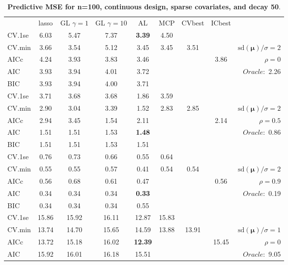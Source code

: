 \clearpage
\begin{table}\vspace{-.5cm}
\caption[l]{ { \bf Predictive MSE for n=100, continuous design, 
sparse covariates, and  decay  50}.}
\vspace{-.5cm}
\footnotesize{}
\begin{center}
\begin{tabular}{l*{7}{c}|r}
 & lasso & GL $\gamma=1$ & GL $\gamma=10$ & AL & MCP  & CVbest & ICbest  \\
\cline{1-9}
CV.1se & 6.03 & 5.47 & 7.37 & {\bf 3.39} & 4.50 & & & \\
CV.min & 3.66 & 3.54 & 5.12 & 3.45 & 3.45 & 3.51 & & $\mathrm{sd}(\mathbf{\mu})/\sigma=2$ \\
AICc & 4.24 & 3.93 & 3.83 & 3.46 & & & 3.86 &  $\rho=0$ \\
AIC & 3.93 & 3.94 & 4.01 & 3.72 & & & &  \multirow{2}{*}{$Oracle: $ 2.26} \\
BIC & 3.93 & 3.94 & 4.00 & 3.71 & & & &  \\
 \hline 
CV.1se & 3.71 & 3.68 & 3.68 & 1.86 & 3.59 & & & \\
CV.min & 2.90 & 3.04 & 3.39 & 1.52 & 2.83 & 2.85 & & $\mathrm{sd}(\mathbf{\mu})/\sigma=2$ \\
AICc & 2.94 & 3.45 & 1.54 & 2.11 & & & 2.14 &  $\rho=0.5$ \\
AIC & 1.51 & 1.51 & 1.53 & {\bf 1.48} & & & &  \multirow{2}{*}{$Oracle: $ 0.86} \\
BIC & 1.51 & 1.51 & 1.53 & 1.51 & & & &  \\
 \hline 
CV.1se & 0.76 & 0.73 & 0.66 & 0.55 & 0.64 & & & \\
CV.min & 0.55 & 0.55 & 0.57 & 0.41 & 0.54 & 0.54 & & $\mathrm{sd}(\mathbf{\mu})/\sigma=2$ \\
AICc & 0.56 & 0.68 & 0.61 & 0.47 & & & 0.56 &  $\rho=0.9$ \\
AIC & 0.34 & 0.34 & 0.34 & {\bf 0.33} & & & &  \multirow{2}{*}{$Oracle: $ 0.19} \\
BIC & 0.34 & 0.34 & 0.34 & 0.55 & & & &  \\
 \hline 
CV.1se & 15.86 & 15.92 & 16.11 & 12.87 & 15.83 & & & \\
CV.min & 13.74 & 14.70 & 15.65 & 14.59 & 13.88 & 13.91 & & $\mathrm{sd}(\mathbf{\mu})/\sigma=1$ \\
AICc & 13.72 & 15.18 & 16.02 & {\bf 12.39} & & & 15.45 &  $\rho=0$ \\
AIC & 15.92 & 16.01 & 16.18 & 15.51 & & & &  \multirow{2}{*}{$Oracle: $ 9.05} \\

\end{tabular}
\end{center}
\end{table}
